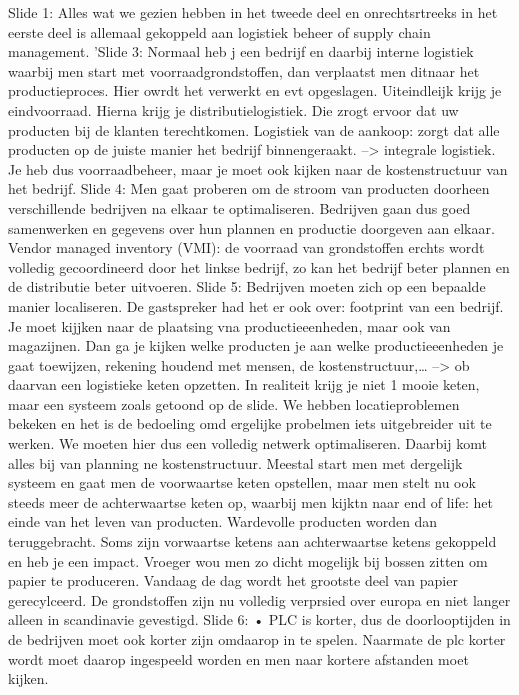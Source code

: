 \documentclass[10pt,a4paper]{report}
\begin{document}
Slide 1: Alles wat we gezien hebben in het tweede deel en onrechtsrtreeks in het eerste deel is allemaal gekoppeld aan logistiek beheer of supply chain management. 
'Slide 3: Normaal heb j een bedrijf en daarbij interne logistiek waarbij men start met voorraadgrondstoffen, dan verplaatst men ditnaar het productieproces. Hier owrdt het verwerkt en evt opgeslagen. Uiteindleijk krijg je eindvoorraad. Hierna krijg je distributielogistiek. Die zrogt ervoor dat uw producten bij de klanten terechtkomen. Logistiek van de aankoop: zorgt dat alle producten op de juiste manier het bedrijf binnengeraakt. --> integrale logistiek.
Je heb dus voorraadbeheer, maar je moet ook kijken naar de kostenstructuur van het bedrijf. 
Slide 4: Men gaat proberen om de stroom van producten doorheen verschillende bedrijven na elkaar te optimaliseren. Bedrijven gaan dus goed samenwerken en gegevens over hun plannen en productie doorgeven aan elkaar. 
Vendor managed inventory (VMI): de voorraad van grondstoffen erchts wordt volledig gecoordineerd door het linkse bedrijf, zo kan het bedrijf beter plannen en de distributie beter uitvoeren.
Slide 5: Bedrijven moeten zich op een bepaalde manier localiseren. De gastspreker had het er ook over: footprint van een bedrijf. Je moet kijjken naar de plaatsing vna productieeenheden, maar ook van magazijnen. Dan ga je kijken welke producten je aan welke productieeenheden je gaat toewijzen, rekening houdend met mensen, de kostenstructuur,… --> ob daarvan een logistieke keten opzetten. 
In realiteit krijg je niet 1 mooie keten, maar een systeem zoals getoond op de slide. 
We hebben locatieproblemen bekeken en het is de bedoeling omd ergelijke probelmen iets uitgebreider uit te werken. We moeten hier dus een volledig netwerk optimaliseren. Daarbij komt alles bij van planning ne kostenstructuur.
Meestal start men met dergelijk systeem en gaat men de voorwaartse keten opstellen, maar men stelt nu ook steeds meer de achterwaartse keten op, waarbij men kijktn naar end of life: het einde van het leven van producten. Wardevolle producten worden dan teruggebracht. 
Soms zijn vorwaartse ketens aan achterwaartse ketens gekoppeld en heb je een impact. Vroeger wou men zo dicht mogelijk bij bossen zitten om papier te produceren. Vandaag de dag wordt het grootste deel van papier gerecylceerd. De grondstoffen zijn nu volledig verprsied over europa en niet langer alleen in scandinavie gevestigd.
Slide 6: 
	• PLC is korter, dus de doorlooptijden in de bedrijven moet ook korter zijn omdaarop in te spelen. Naarmate de plc korter wordt moet daarop ingespeeld worden en men naar kortere afstanden moet kijken.
\end{document}
